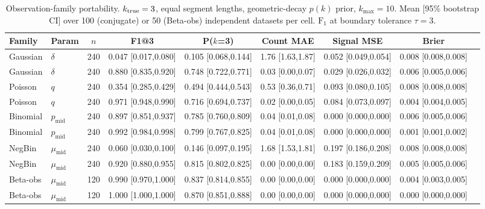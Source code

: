 \begin{table}[!htbp]
\centering
\footnotesize
\caption{Observation-family portability. $k_{\rm true}=3$, equal segment lengths, geometric-decay $p(k)$ prior, $k_{\max}=10$. Mean [95\% bootstrap CI] over 100 (conjugate) or 50 (Beta-obs) independent datasets per cell. $\mathrm{F_1}$ at boundary tolerance $\tau=3$.}
\label{tab:E02-recovery-paper}
\begin{tabular}{llccccccc}
\toprule
Family & Param & $n$ & F1@3 & P($k$=3) & Count MAE & Signal MSE & Brier \\
\midrule
Gaussian & $\delta$ & 240 & 0.047 [0.017,0.080] & 0.105 [0.068,0.144] & 1.76 [1.63,1.87] & 0.052 [0.049,0.054] & 0.008 [0.008,0.008] \\
Gaussian & $\delta$ & 240 & 0.880 [0.835,0.920] & 0.748 [0.722,0.771] & 0.03 [0.00,0.07] & 0.029 [0.026,0.032] & 0.006 [0.005,0.006] \\
\midrule
Poisson & $q$ & 240 & 0.354 [0.285,0.429] & 0.494 [0.444,0.543] & 0.53 [0.36,0.71] & 0.093 [0.080,0.105] & 0.008 [0.008,0.008] \\
Poisson & $q$ & 240 & 0.971 [0.948,0.990] & 0.716 [0.694,0.737] & 0.02 [0.00,0.05] & 0.084 [0.073,0.097] & 0.004 [0.004,0.005] \\
\midrule
Binomial & $p_{\mathrm{mid}}$ & 240 & 0.897 [0.851,0.937] & 0.785 [0.760,0.809] & 0.04 [0.01,0.08] & 0.000 [0.000,0.000] & 0.006 [0.005,0.006] \\
Binomial & $p_{\mathrm{mid}}$ & 240 & 0.992 [0.984,0.998] & 0.799 [0.767,0.825] & 0.04 [0.01,0.08] & 0.000 [0.000,0.000] & 0.001 [0.001,0.002] \\
\midrule
NegBin & $\mu_{\mathrm{mid}}$ & 240 & 0.060 [0.030,0.100] & 0.146 [0.097,0.195] & 1.68 [1.53,1.81] & 0.197 [0.186,0.208] & 0.008 [0.008,0.008] \\
NegBin & $\mu_{\mathrm{mid}}$ & 240 & 0.920 [0.880,0.955] & 0.815 [0.802,0.825] & 0.00 [0.00,0.00] & 0.183 [0.159,0.209] & 0.005 [0.005,0.006] \\
\midrule
Beta-obs & $\mu_{\mathrm{mid}}$ & 120 & 0.990 [0.970,1.000] & 0.837 [0.814,0.855] & 0.00 [0.00,0.00] & 0.000 [0.000,0.000] & 0.004 [0.003,0.005] \\
Beta-obs & $\mu_{\mathrm{mid}}$ & 120 & 1.000 [1.000,1.000] & 0.870 [0.851,0.888] & 0.00 [0.00,0.00] & 0.000 [0.000,0.000] & 0.000 [0.000,0.000] \\
\bottomrule
\end{tabular}
\end{table}
